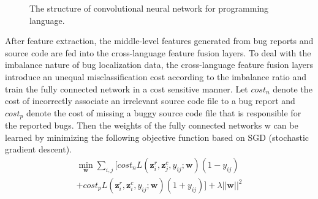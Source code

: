 \begin{figure}[hbt]
\centering
\caption{The structure of convolutional neural network for programming language.}
\label{fig:npcnn}
\end{figure}

After feature extraction, the middle-level features generated from bug reports and source code are fed into the cross-language feature fusion layers. To deal with the imbalance nature of bug localization data, the cross-language feature fusion layers introduce an unequal misclassification cost according to the imbalance ratio and train the fully connected network in a cost sensitive manner. Let $cost_n$ denote the cost of incorrectly associate an irrelevant source code file to a bug report and $cost_p$ denote the cost of missing a buggy source code file that is responsible for the reported bugs. Then the weights of the fully connected networks w can be learned by minimizing the following objective function based on SGD (stochastic gradient descent).
\begin{equation}
\begin{aligned}
\label{eq:cost2}
\mathop{\min}_{\mathbf{w}}\sum_{i,j}{[cost_n L(\mathbf{z}^{r}_i, \mathbf{z}^{c}_j, y_{ij}; \mathbf{w})(1-y_{ij})} \\
 {+cost_p L(\mathbf{z}^{r}_i, \mathbf{z}^{c}_i, y_{ij}; \mathbf{w})(1+y_{ij})]}+\lambda||\mathbf{w}||^2
\end{aligned}
\end{equation}

